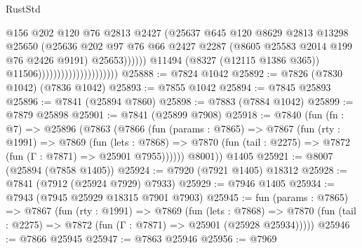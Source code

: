 \begin{lexlean}{RustStd}
\begin{coremodule}
                                                      @156
                                                      @202
                                                      @120
                                                      @76
                                                      @2813
                                                      @2427
                                                      (@25637
                                                        @645
                                                        @120
                                                        @8629
                                                        @2813
                                                        @13298
                                                        @25650
                                                        (@25636
                                                          @202
                                                          @97
                                                          @76
                                                          @66
                                                          @2427
                                                          @2287
                                                          (@8605 @25583 @2014 @199 @76 @2426 @9191)
                                                          @25653))))))
                                              @11494
                                              (@8327 (@12115 @1386 @365))
                                              @11506)))))))))))))))))))))
@25888 := @7824 @1042
@25892 := @7826 (@7830 @1042) (@7836 @1042)
@25893 := @7855 @1042
@25894 := @7845 @25893
@25896 := @7841 (@25894 @7860)
@25898 := @7883 (@7884 @1042)
@25899 := @7879 @25898
@25901 := @7841 (@25899 @7908)
@25918 := @7840
    (fun (fn : @7) =>
    @25896
      (@7863
        (@7866
          (fun (params : @7865) =>
          @7867
            (fun (rty : @1991) =>
            @7869
              (fun (lets : @7868) =>
              @7870 (fun (tail : @2275) => @7872 (fun (Γ : @7871) => @25901 @7955))))))
        @8001))
    @1405
@25921 := @8007 (@25894 (@7858 @1405))
@25924 := @7920 (@7921 @1405) @18312
@25928 := @7841 (@7912 (@25924 @7929) @7933)
@25929 := @7946 @1405
@25934 := @7943 (@7945 @25929 @18315 @7901 @7903)
@25945 := fun (params : @7865) =>
  @7867
    (fun (rty : @1991) =>
    @7869
      (fun (lets : @7868) =>
      @7870 (fun (tail : @2275) => @7872 (fun (Γ : @7871) => @25901 (@25928 @25934)))))
@25946 := @7866 @25945
@25947 := @7863 @25946
@25956 := @7969

\end{coremodule}
\end{lexlean}
